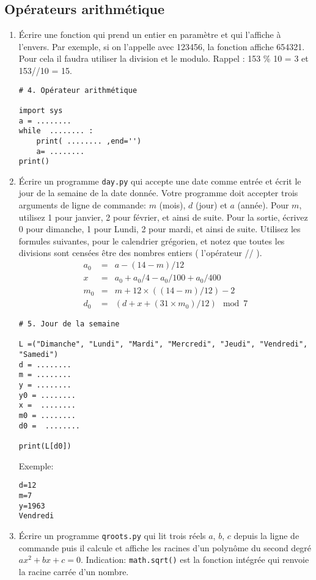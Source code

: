 \documentclass[a4paper]{article}
\begin{document}
\subsection{Opérateurs arithmétique}
\begin{enumerate}
\item Écrire une fonction qui prend un entier en paramètre et qui l'affiche à l'envers. Par exemple, si on l'appelle avec 123456, la fonction affiche 654321. Pour cela il faudra utiliser la division et le modulo. Rappel : 153 \% 10 = 3 et 153//10 = 15.

\begin{lstlisting}
# 4. Opérateur arithmétique

import sys
a = ........
while  ........ :
    print( ........ ,end='')
    a= ........
print()
\end{lstlisting}

\item Écrire un programme {\tt day.py} qui accepte une date comme entrée et écrit le jour de la semaine de la date donnée. Votre programme doit accepter trois arguments de ligne de commande: $m$ (mois), $d$ (jour) et $a$
(année). Pour $m$, utilisez 1 pour janvier, 2 pour février, et ainsi de suite. Pour la sortie, écrivez 0 pour dimanche, 1 pour
Lundi, 2 pour mardi, et ainsi de suite.
Utilisez les formules suivantes, pour le calendrier grégorien, et notez que toutes les divisions sont censées être des nombres entiers ( l'opérateur // ).
\[
\begin{array}{lcl}
a_0 &= &a - (14 - m)/12\\
x & = & a_0 + a_0/4 - a_0/100 + a_0/400\\
m_0 & = & m + 12 \times ( (14 - m) / 12) - 2\\
d_0 & = &  (d + x + (31\times m_0)/12) \mod 7
\end{array}
\]

\begin{lstlisting}
# 5. Jour de la semaine

L =("Dimanche", "Lundi", "Mardi", "Mercredi", "Jeudi", "Vendredi", "Samedi")
d = ........
m = ........
y = ........
y0 = ........
x =  ........
m0 = ........
d0 =  ........

print(L[d0])
\end{lstlisting}
Exemple:
\begin{verbatim}
d=12
m=7
y=1963
Vendredi
\end{verbatim}

\item Écrire un programme {\tt qroots.py} qui lit trois réels $a$, $b$, $c$ depuis la ligne de commande puis il calcule et affiche les racines d'un polynôme du second degré  $ax^2 + bx + c = 0$.
Indication: {\tt math.sqrt()} est la fonction intégrée qui renvoie la racine carrée d'un nombre.


\end{enumerate}
\end{document}
